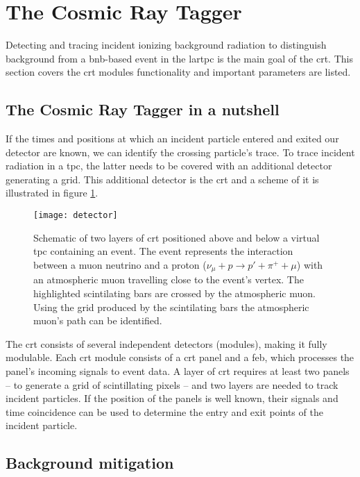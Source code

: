 \section{The Cosmic Ray Tagger}
Detecting and tracing incident ionizing background radiation to distinguish background from a \gls{bnb}-based event in the \gls{lartpc} is the main goal of the \gls{crt}.
This section covers the \gls{crt} modules functionality and important parameters are listed.

\subsection{The Cosmic Ray Tagger in a nutshell}
If the times and positions at which an incident particle entered and exited our detector are known, we can identify the crossing particle's trace.
To trace incident radiation in a \gls{tpc}, the latter needs to be covered with an additional detector generating a grid.
This additional detector is the \gls{crt} and a scheme of it is illustrated in figure \ref{fig:scheme}.

\begin{figure}
  \texttt{[image: detector]}
  \caption{%
    Schematic of two layers of \gls{crt} positioned above and below a virtual \gls{tpc} containing an event.
    The event represents the interaction between a muon neutrino and a proton ($\nu_\mu + p \to p' + \pi^+ + \mu$) with an atmospheric muon travelling close to the event's vertex.
    The highlighted scintilating bars are crossed by the atmospheric muon.
    Using the grid produced by the scintilating bars the atmospheric muon's path can be identified.
  }
  \label{fig:scheme}
\end{figure}

The \gls{crt} consists of several independent detectors (modules), making it fully modulable.
Each \gls{crt} module consists of a \gls{crt} panel and a \gls{feb}, which processes the panel's incoming signals to event data.
A layer of \gls{crt} requires at least two panels -- to generate a grid of scintillating pixels -- and two layers are needed to track incident particles.
If the position of the panels is well known, their signals and time coincidence can be used to determine the entry and exit points of the incident particle.

\subsection{Background mitigation}

